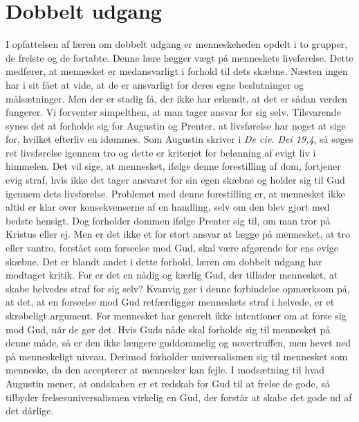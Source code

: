 \section{Dobbelt udgang}
I opfattelsen af læren om dobbelt udgang er menneskeheden opdelt i to grupper, de frelste og de fortabte. Denne lære lægger vægt på menneskets livsførelse. Dette medfører, at mennesket er medansvarligt i forhold til dets skæbne. Næsten ingen har i sit fået at vide, at de er ansvarligt for deres egne beslutninger og målsætninger. Men der er stadig få, der ikke har erkendt, at det er sådan verden fungerer. Vi forventer simpelthen, at man tager ansvar for sig selv. Tilsvarende synes det at forholde sig for Augustin og Prenter, at livsførelse har noget at sige for, hvilket efterliv en idømmes. Som Augustin skriver i \textit{De civ. Dei 19,4}, så søges ret livsførelse igennem tro og dette er kriteriet for belønning af evigt liv i himmelen. Det vil sige, at mennesket, ifølge denne forestilling af dom, fortjener evig straf, hvis ikke det tager ansvaret for sin egen skæbne og holder sig til Gud igennem dets livsførelse. Problemet med denne forestilling er, at mennesket ikke altid er klar over konsekvenserne af en handling, selv om den blev gjort med bedste hensigt. Dog forholder dommen ifølge Prenter sig til, om man tror på Kristus eller ej. Men er det ikke et for stort ansvar at lægge på mennesket, at tro eller vantro, forstået som forseelse mod Gud, skal være afgørende for ens evige skæbne. Det er blandt andet i dette forhold, læren om dobbelt udgang har modtaget kritik. For er det en nådig og kærlig Gud, der tillader mennesket, at skabe helvedes straf for sig selv? Kvanvig gør i denne forbindelse opmærksom på, at det, at en forseelse mod Gud retfærdiggør menneskets straf i helvede, er et skrøbeligt argument. For mennesket har generelt ikke intentioner om at forse sig mod Gud, når de gør det. Hvis Guds nåde skal forholde sig til mennesket på denne måde, så er den ikke længere guddommelig og uovertruffen, men hevet ned på menneskeligt niveau. Derimod forholder universalismen sig til mennesket som menneske, da den accepterer at mennesker kan fejle. I modsætning til hvad Augustin mener, at ondskaben er et redskab for Gud til at frelse de gode, så tilbyder frelsesuniversalismen virkelig en Gud, der forstår at skabe det gode ud af det dårlige.

